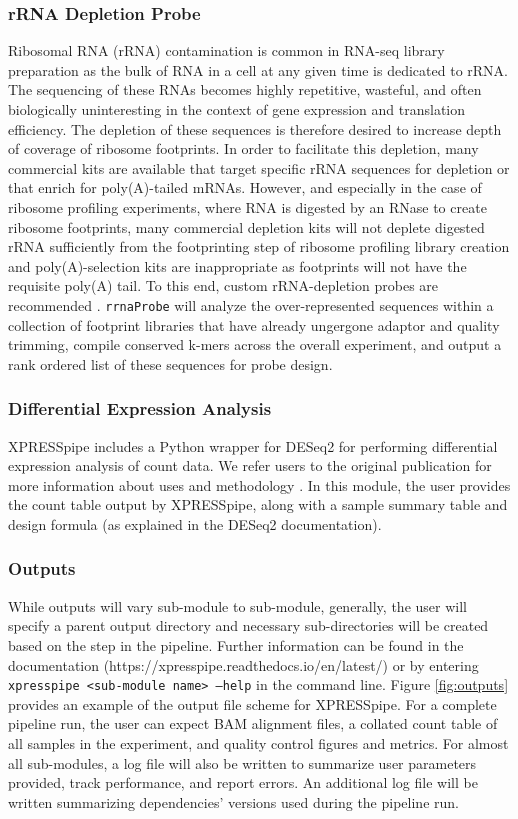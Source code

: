 \documentclass[10pt, oneside]{article}
\begin{document}
\subsubsection{rRNA Depletion Probe}
Ribosomal RNA (rRNA) contamination is common in RNA-seq library preparation as the bulk of RNA in a cell at any given time is dedicated to rRNA. The sequencing of these RNAs becomes highly repetitive, wasteful, and often biologically uninteresting in the context of gene expression and translation efficiency. The depletion of these sequences is therefore desired to increase depth of coverage of ribosome footprints. In order to facilitate this depletion, many commercial kits are available that target specific rRNA sequences for depletion or that enrich for poly(A)-tailed mRNAs. However, and especially in the case of ribosome profiling experiments, where RNA is digested by an RNase to create ribosome footprints, many commercial depletion kits will not deplete digested rRNA sufficiently from the footprinting step of ribosome profiling library creation and poly(A)-selection kits are inappropriate as footprints will not have the requisite poly(A) tail. To this end, custom rRNA-depletion probes are recommended \cite{ingolia_meth, ingolia_science}. \texttt{rrnaProbe} will analyze the over-represented sequences within a collection of footprint libraries that have already ungergone adaptor and quality trimming, compile conserved k-mers across the overall experiment, and output a rank ordered list of these sequences for probe design.

\subsubsection{Differential Expression Analysis}
XPRESSpipe includes a Python wrapper for DESeq2 for performing differential expression analysis of count data. We refer users to the original publication for more information about uses and methodology \cite{deseq2}. In this module, the user provides the count table output by XPRESSpipe, along with a sample summary table and design formula (as explained in the DESeq2 documentation).


\subsubsection{Outputs}
While outputs will vary sub-module to sub-module, generally, the user will specify a parent output directory and necessary sub-directories will be created based on the step in the pipeline. Further information can be found in the documentation (https://xpresspipe.readthedocs.io/en/latest/) or by entering \texttt{xpresspipe \textless sub-module name\textgreater \ --help} in the command line. Figure \ref{fig:outputs} provides an example of the output file scheme for XPRESSpipe. For a complete pipeline run, the user can expect BAM alignment files, a collated count table of all samples in the experiment, and quality control figures and metrics. For almost all sub-modules, a log file will also be written to summarize user parameters provided, track performance, and report errors. An additional log file will be written summarizing dependencies' versions used during the pipeline run.
\end{document}
